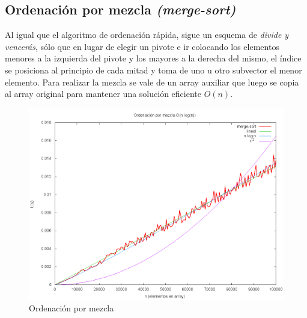 \subsection{Ordenación por mezcla \textit{(merge-sort)}}
Al igual que el algoritmo de ordenación rápida, sigue un esquema de \textit{divide y vencerás}, sólo que en lugar de elegir un pivote e ir colocando los elementos menores a la izquierda del pivote y los mayores a la derecha del mismo, el índice se posiciona al principio de cada mitad y toma de uno u otro subvector el menor elemento.  Para realizar la mezcla se vale de un array auxiliar que luego se copia al array original para mantener una solución eficiente $O(n)$.\cite{EDA}
	\begin{figure}[H]
  		\centering
   	 	\includegraphics[width=1.0\textwidth]{merge-sort.png}
  		\caption{Ordenación por mezcla}
  		\label{fig:merge}
	\end{figure}
